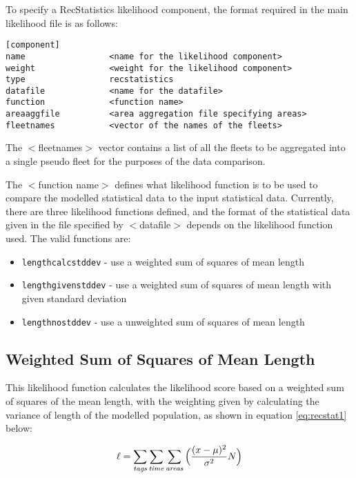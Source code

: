 \documentclass[]{book}
\providecommand{\tightlist}{%
  \setlength{\itemsep}{0pt}\setlength{\parskip}{0pt}}
\begin{document}
To specify a RecStatistics likelihood component, the format required in
the main likelihood file is as follows:

\begin{verbatim}
[component]
name                 <name for the likelihood component>
weight               <weight for the likelihood component>
type                 recstatistics
datafile             <name for the datafile>
function             <function name>
areaaggfile          <area aggregation file specifying areas>
fleetnames           <vector of the names of the fleets>
\end{verbatim}

The \(<\)fleetnames\(>\) vector contains a list of all the fleets to be
aggregated into a single pseudo fleet for the purposes of the data
comparison.

The \(<\)function name\(>\) defines what likelihood function is to be used
to compare the modelled statistical data to the input statistical data.
Currently, there are three likelihood functions defined, and the format
of the statistical data given in the file specified by \(<\)datafile\(>\)
depends on the likelihood function used. The valid functions are:

\begin{itemize}
\tightlist
\item
  \texttt{lengthcalcstddev} - use a weighted sum of squares of mean length
\item
  \texttt{lengthgivenstddev} - use a weighted sum of squares of mean length with given standard deviation
\item
  \texttt{lengthnostddev} - use a unweighted sum of squares of mean length
\end{itemize}

\hypertarget{weighted-sum-of-squares-of-mean-length-1}{%
\subsection{Weighted Sum of Squares of Mean Length}\label{weighted-sum-of-squares-of-mean-length-1}}

This likelihood function calculates the likelihood score based on a
weighted sum of squares of the mean length, with the weighting given by
calculating the variance of length of the modelled population, as shown
in equation \eqref{eq:recstat1} below:

\begin{equation}
\label{eq:recstat1}
\ell = \sum_{\it tags}\sum_{\it time}\sum_{\it areas} \Big(\frac{(x-\mu)^2} {\sigma^2} N\Big)\end{equation}
\end{document}
